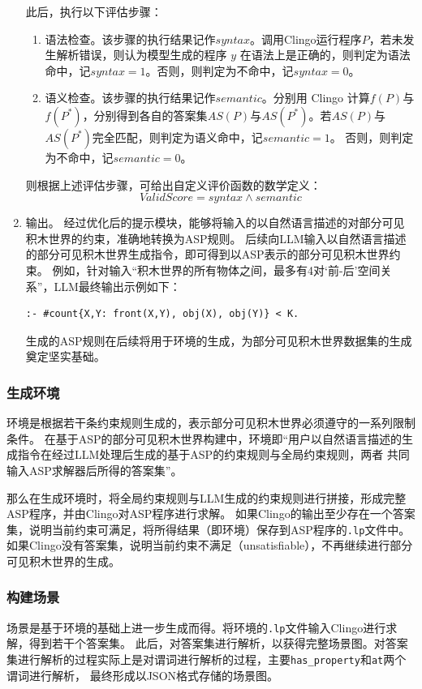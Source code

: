 \begin{enumerate}[nosep]
此后，执行以下评估步骤：
\begin{enumerate}[nosep]
\item 语法检查。该步骤的执行结果记作$syntax$。调用Clingo运行程序$P$，若未发生解析错误，则认为模型生成的程序 $y$ 在语法上是正确的，则判定为语法命中，记$syntax = 1$。否则，则判定为不命中，记$syntax = 0$。
\item 语义检查。该步骤的执行结果记作$semantic$。分别用 Clingo 计算$f(P)$与$f(P^*)$，分别得到各自的答案集$AS(P)$与$AS(P^*)$。若$AS(P)$与$AS(P^*)$完全匹配，则判定为语义命中，记$semantic = 1$。
否则，则判定为不命中，记$semantic = 0$。
\end{enumerate}

则根据上述评估步骤，可给出自定义评价函数的数学定义：
$$ValidScore = syntax \land semantic $$
\item 输出。
经过优化后的提示模块，能够将输入的以自然语言描述的对部分可见积木世界的约束，准确地转换为ASP规则。
后续向LLM输入以自然语言描述的部分可见积木世界生成指令，即可得到以ASP表示的部分可见积木世界约束。
例如，针对输入“积木世界的所有物体之间，最多有4对‘前-后’空间关系”，LLM最终输出示例如下：
\begin{lstlisting}
:- #count{X,Y: front(X,Y), obj(X), obj(Y)} < K.
\end{lstlisting}
生成的ASP规则在后续将用于环境的生成，为部分可见积木世界数据集的生成奠定坚实基础。
\end{enumerate}
\subsubsection{生成环境}
环境是根据若干条约束规则生成的，表示部分可见积木世界必须遵守的一系列限制条件。
在基于ASP的部分可见积木世界构建中，环境即“用户以自然语言描述的生成指令在经过LLM处理后生成的基于ASP的约束规则与全局约束规则，两者
共同输入ASP求解器后所得的答案集”。

那么在生成环境时，将全局约束规则与LLM生成的约束规则进行拼接，形成完整ASP程序，并由Clingo对ASP程序进行求解。
如果Clingo的输出至少存在一个答案集，说明当前约束可满足，将所得结果（即环境）保存到ASP程序的\texttt{.lp}文件中。
如果Clingo没有答案集，说明当前约束不满足（unsatisfiable），不再继续进行部分可见积木世界的生成。
\subsubsection{构建场景}
场景是基于环境的基础上进一步生成而得。将环境的\texttt{.lp}文件输入Clingo进行求解，得到若干个答案集。
此后，对答案集进行解析，以获得完整场景图。对答案集进行解析的过程实际上是对谓词进行解析的过程，主要\texttt{has\_property}和\texttt{at}两个谓词进行解析，
最终形成以JSON格式存储的场景图。

